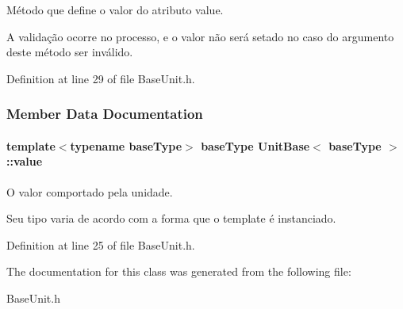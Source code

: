 Método que define o valor do atributo value. 

A validação ocorre no processo, e o valor não será setado no caso do argumento deste método ser inválido. 

Definition at line 29 of file Base\-Unit.\-h.



\subsubsection{Member Data Documentation}
\hypertarget{classUnitBase_a1c1ad08b45f07a94e5cf71dee734436b}{
\paragraph[{value}]{\setlength{\rightskip}{0pt plus 5cm}template$<$typename base\-Type$>$ base\-Type {\bf Unit\-Base}$<$ base\-Type $>$\-::value\hspace{0.3cm}{\ttfamily [protected]}}}\label{d5/db5/classUnitBase_a1c1ad08b45f07a94e5cf71dee734436b}


O valor comportado pela unidade. 

Seu tipo varia de acordo com a forma que o template é instanciado. 

Definition at line 25 of file Base\-Unit.\-h.



The documentation for this class was generated from the following file\-:\begin{DoxyCompactItemize}
\item 
Base\-Unit.\-h\end{DoxyCompactItemize}
